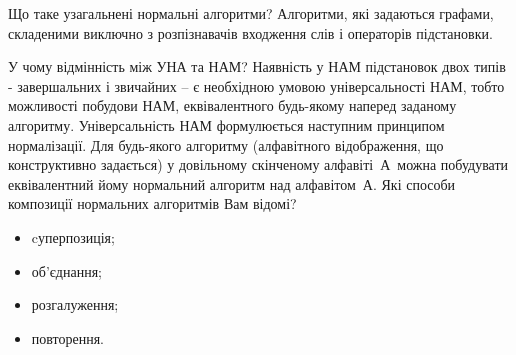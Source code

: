 \documentclass[a4paper, 12pt, oneside]{extarticle}
\begin{document}
\begin{itemize}
	\question Що таке узагальнені нормальні алгоритми?
	\answer Алгоритми, які задаються графами, складеними виключно з
розпізнавачів входження слів і операторів підстановки.

	\question У чому відмінність між УНА та НАМ?
	\answer Наявність у НАМ підстановок двох типів - завершальних і звичайних – є необхідною умовою універсальності НАМ, тобто можливості побудови НАМ, еквівалентного будь-якому наперед заданому алгоритму. Універсальність НАМ формулюється наступним принципом нормалізації. Для будь-якого алгоритму (алфавітного відображення, що конструктивно задається) у довільному скінченому алфавіті А можна побудувати еквівалентний йому нормальний алгоритм над алфавітом А.
\newpage
	\question Які способи композиції нормальних алгоритмів Вам відомі?
	\answer
	\begin{itemize}
		\item	cуперпозиція;
		\item	об'єднання;
		\item	розгалуження;
		\item	повторення.
	\end{itemize}
\end{itemize}
\end{document}
